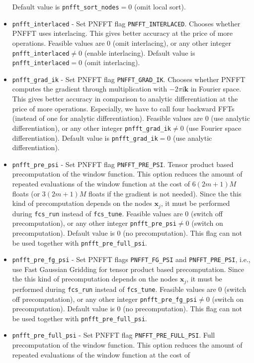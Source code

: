 \begin{itemize}
    Default value is \verb!pnfft_sort_nodes!$=0$ (omit local sort).
  \item \verb!pnfft_interlaced! -
    Set PNFFT flag \verb!PNFFT_INTERLACED!. Chooses whether PNFFT uses interlacing. This gives better accuracy at the price of more operations.
    Feasible values are $0$ (omit interlacing), or any other integer \verb!pnfft_interlaced!$\ne0$ (enable interlacing).
    Default value is \verb!pnfft_interlaced!$=0$ (omit interlacing).
  \item \verb!pnfft_grad_ik! -
    Set PNFFT flag \verb!PNFFT_GRAD_IK!. Chooses whether PNFFT computes the gradient through multiplication with $-2\pi\textrm{i}\mathbf{k}$ in Fourier space.
    This gives better accuracy in comparison to analytic differentiation at the price of more operations. Especially, we have to call four backward FFTs (instead of one for analytic differentiation).
    Feasible values are $0$ (use analytic differentiation), or any other integer \verb!pnfft_grad_ik!$\ne0$ (use Fourier space differentiation).
    Default value is \verb!pnfft_grad_ik!$=0$ (use analytic differentiation).
  \item \verb!pnfft_pre_psi! -
    Set PNFFT flag \verb!PNFFT_PRE_PSI!. Tensor product based precomputation of the window function. This option reduces the amount of repeated evaluations of the window function at the cost of
    $6(2m+1)M$ floats (or $3(2m+1)M$ floats if the gradient is not needed).
    Since the this kind of precomputation depends on the nodes $\mathbf x_j$, it must be performed during \verb!fcs_run! instead of \verb!fcs_tune!.
    Feasible values are $0$ (switch off precomputation), or any other integer \verb!pnfft_pre_psi!$\ne0$ (switch on precomputation).
    Default value is $0$ (no precomputation). This flag can not be used together with \verb!pnfft_pre_full_psi!.
  \item \verb!pnfft_pre_fg_psi! -
    Set PNFFT flags \verb!PNFFT_FG_PSI! and \verb!PNFFT_PRE_PSI!, i.e., use Fast Gaussian Gridding for tensor product based precomputation.
    Since the this kind of precomputation depends on the nodes $\mathbf x_j$, it must be performed during \verb!fcs_run! instead of \verb!fcs_tune!.
    Feasible values are $0$ (switch off precomputation), or any other integer \verb!pnfft_pre_fg_psi!$\ne0$ (switch on precomputation).
    Default value is $0$ (no precomputation). This flag can not be used together with \verb!pnfft_pre_full_psi!.
  \item \verb!pnfft_pre_full_psi! -
    Set PNFFT flag \verb!PNFFT_PRE_FULL_PSI!. Full precomputation of the window function. This option reduces the amount of repeated evaluations of the window function at the cost of

\end{itemize}
